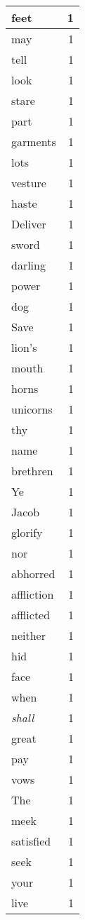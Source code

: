 \begin{center}
\begin{longtable}{l|r}
feet & 1 \\ \hline
may & 1 \\ \hline
tell & 1 \\ \hline
look & 1 \\ \hline
stare & 1 \\ \hline
part & 1 \\ \hline
garments & 1 \\ \hline
lots & 1 \\ \hline
vesture & 1 \\ \hline
haste & 1 \\ \hline
Deliver & 1 \\ \hline
sword & 1 \\ \hline
darling & 1 \\ \hline
power & 1 \\ \hline
dog & 1 \\ \hline
Save & 1 \\ \hline
lion's & 1 \\ \hline
mouth & 1 \\ \hline
horns & 1 \\ \hline
unicorns & 1 \\ \hline
thy & 1 \\ \hline
name & 1 \\ \hline
brethren & 1 \\ \hline
Ye & 1 \\ \hline
Jacob & 1 \\ \hline
glorify & 1 \\ \hline
nor & 1 \\ \hline
abhorred & 1 \\ \hline
affliction & 1 \\ \hline
afflicted & 1 \\ \hline
neither & 1 \\ \hline
hid & 1 \\ \hline
face & 1 \\ \hline
when & 1 \\ \hline
\emph{shall} & 1 \\ \hline
great & 1 \\ \hline
pay & 1 \\ \hline
vows & 1 \\ \hline
The & 1 \\ \hline
meek & 1 \\ \hline
satisfied & 1 \\ \hline
seek & 1 \\ \hline
your & 1 \\ \hline
live & 1 \\ \hline

\end{longtable}
\end{center}
